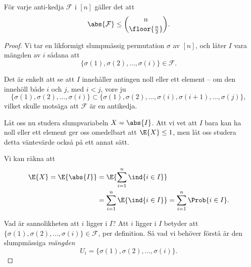 \documentclass[nobib]{tufte-handout}
\begin{document}
\begin{lemma}
    För varje anti-kedja $\mathcal{F}$ i $[n]$ gäller det att
    $$\abs{\mathcal{F}} \leq \binom{n}{\floor{\frac{n}{2}}}.$$

    \begin{proof}
        Vi tar en likformigt slumpmässig permutation $\sigma$ av $[n]$, och låter $I$ vara mängden av $i$ sådana att
        $$\{\sigma(1), \sigma(2), \ldots, \sigma(i)\} \in \mathcal{F}.$$

        Det är enkelt att se att $I$ innehåller antingen noll eller ett element -- om den innehöll både $i$ och $j$, med $i < j$, vore ju
        $$\{\sigma(1), \sigma(2), \ldots, \sigma(i)\} \subset \{\sigma(1), \sigma(2), \ldots, \sigma(i), \sigma(i+1), \ldots, \sigma(j)\},$$
        vilket skulle motsäga att $\mathcal{F}$ är en antikedja.

        Låt oss nu studera slumpvariabeln $X = \abs{I}$. Att vi vet att $I$ bara kan ha noll eller ett element ger oss omedelbart att $\E{X} \leq 1$, men låt oss studera detta väntevärde också på ett annat sätt.

        Vi kan räkna att
        \begin{align*}
            \E{X} = \E{\abs{I}} &= \E{\sum_{i=1}^{n} \ind{i \in I}}\\
            &= \sum_{i=1}^{n} \E{\ind{i \in I}} = \sum_{i=1}^{n} \Prob{i \in I}.
        \end{align*}

        Vad är sannolikheten att $i$ ligger i $I$? Att $i$ ligger i $I$ betyder att $\{\sigma(1), \sigma(2), \ldots, \sigma(i)\} \in \mathcal{F}$, per definition. Så vad vi behöver förstå är den slumpmässiga \emph{mängden} 
        $$U_i = \{\sigma(1), \sigma(2), \ldots, \sigma(i)\}.$$


\end{proof}
\end{lemma}
\end{document}
